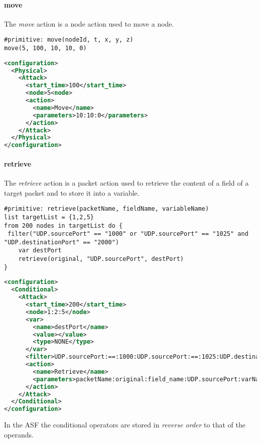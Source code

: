\paragraph{move}
The \emph{move} action is a node action used to move a node.
%
\begin{lstlisting}[language={asl},caption={ASL move example}]
#primitive: move(nodeId, t, x, y, z)
move(5, 100, 10, 10, 0)
\end{lstlisting}
%
\begin{lstlisting}[language={xml},caption={Interpreter output}]
<configuration>
  <Physical>
    <Attack>
      <start_time>100</start_time>
      <node>5<node>
      <action>
        <name>Move</name>
        <parameters>10:10:0</parameters>
      </action>
    </Attack>
  </Physical>
</configuration>
\end{lstlisting}

\paragraph{retrieve}
The \emph{retrieve} action is a packet action used to retrieve the content of a field of a target packet and to store it into a variable.
%
\begin{lstlisting}[language={asl},caption={ASL retrieve example}]
#primitive: retrieve(packetName, fieldName, variableName)
list targetList = {1,2,5}
from 200 nodes in targetList do {
 filter("UDP.sourcePort" == "1000" or "UDP.sourcePort" == "1025" and "UDP.destinationPort" == "2000")
    var destPort
    retrieve(original, "UDP.sourcePort", destPort)
}
\end{lstlisting}
%
\begin{lstlisting}[language={xml},caption={Interpreter output}]
<configuration>
  <Conditional>
    <Attack>
      <start_time>200</start_time>
      <node>1:2:5</node>
      <var>
        <name>destPort</name>
        <value></value>
        <type>NONE</type>
      </var>
      <filter>UDP.sourcePort:==:1000:UDP.sourcePort:==:1025:UDP.destinationPort:==:2000:AND:OR</filter>
      <action>
        <name>Retrieve</name>
        <parameters>packetName:original:field_name:UDP.sourcePort:varName:destPort</parameters>
      </action>
    </Attack>
  </Conditional>
</configuration>
\end{lstlisting}
%
In the ASF the conditional operators are stored in \emph{reverse order} to that of the operands.

